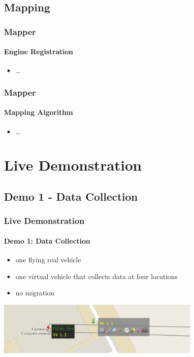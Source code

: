 \documentclass{beamer}
\begin{document}
\subsection{Mapping}

\begin{frame}\frametitle{Mapper}\framesubtitle{Engine Registration}
	\begin{itemize}
		\item \ldots
	\end{itemize} 
\end{frame}

\begin{frame}\frametitle{Mapper}\framesubtitle{Mapping Algorithm}
	\begin{itemize}
		\item \ldots
	\end{itemize} 
\end{frame}

\section{Live Demonstration}
\subsection{Demo 1 - Data Collection}

\begin{frame}\frametitle{Live Demonstration}\framesubtitle{Demo 1: Data Collection}
	\begin{itemize}
		\item one flying real vehicle
		\item one virtual vehicle that collects data at four locations
		\item no migration
	\end{itemize}
	\vspace{0.5cm}
	\begin{center}
		{\includegraphics[width=10cm]{demo1.png}}
	\end{center}
\end{frame}
\end{document}
